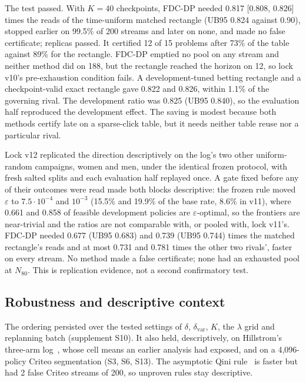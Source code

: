\documentclass[sigconf,anonymous,review]{acmart}
\newcommand{\eps}{\varepsilon}
\newcommand{\dvar}{\delta_{\text{var}}}
\begin{document}
The test passed. With $K = 40$ checkpoints, FDC-DP needed 0.817 [0.808, 0.826] times the reads of the time-uniform matched rectangle (UB95 0.824 against 0.90), stopped earlier on 99.5\% of 200 streams and later on none, and made no false certificate; replicas passed. It certified 12 of 15 problems after 73\% of the table against 89\% for the rectangle. FDC-DP emptied no pool on any stream and neither method did on 188, but the rectangle reached the horizon on 12, so lock v10's pre-exhaustion condition fails. A development-tuned betting rectangle and a checkpoint-valid exact rectangle gave 0.822 and 0.826, within 1.1\% of the governing rival. The development ratio was 0.825 (UB95 0.840), so the evaluation half reproduced the development effect. The saving is modest because both methods certify late on a sparse-click table, but it needs neither table reuse nor a particular rival.

Lock v12 replicated the direction descriptively on the log's two other uniform-random campaigns, women and men, under the identical frozen protocol, with fresh salted splits and each evaluation half replayed once. A gate fixed before any of their outcomes were read made both blocks descriptive: the frozen rule moved $\eps$ to $7.5 \cdot 10^{-4}$ and $10^{-3}$ (15.5\% and 19.9\% of the base rate, 8.6\% in v11), where 0.661 and 0.858 of feasible development policies are $\eps$-optimal, so the frontiers are near-trivial and the ratios are not comparable with, or pooled with, lock v11's. FDC-DP needed 0.677 (UB95 0.683) and 0.739 (UB95 0.744) times the matched rectangle's reads and at most 0.731 and 0.781 times the other two rivals', faster on every stream. No method made a false certificate; none had an exhausted pool at $N_{80}$. This is replication evidence, not a second confirmatory test.

\subsection{Robustness and descriptive context}\label{sec:external}

The ordering persisted over the tested settings of $\delta$, $\dvar$, $K$, the $\lambda$ grid and replanning batch (supplement S10). It also held, descriptively, on Hillstrom's three-arm log~\citep{hillstrom2008minethatdata}, whose cell means an earlier analysis had exposed, and on a 4,096-policy Criteo segmentation (S3, S6, S13). The asymptotic Qini rule~\citep{sverdrup2023qini} is faster but had 2 false Criteo streams of 200, so unproven rules stay descriptive.
\end{document}

